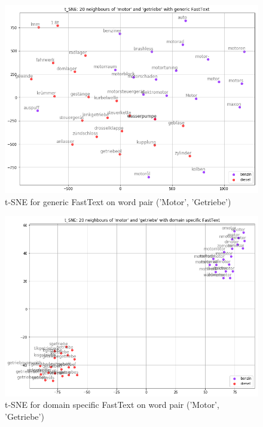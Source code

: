 \documentclass[10pt,a4paper]{article}
\begin{document}
\begin{figure}
	\begin{center}
		\includegraphics[scale=0.4]{./Pictures/model_ft_motor_getriebe.png}
		
		\caption{t-SNE for generic FastText on word pair ('Motor', 'Getriebe')}
	\end{center}
\end{figure}

\begin{figure}
	\begin{center}
		\includegraphics[scale=0.4]{./Pictures/model_ds_ft_motor_getriebe.png}
		
		\caption{t-SNE for domain specific FastText on word pair ('Motor', 'Getriebe')}
		\label{tsne2}
	\end{center}
    
\end{figure}
\end{document}
